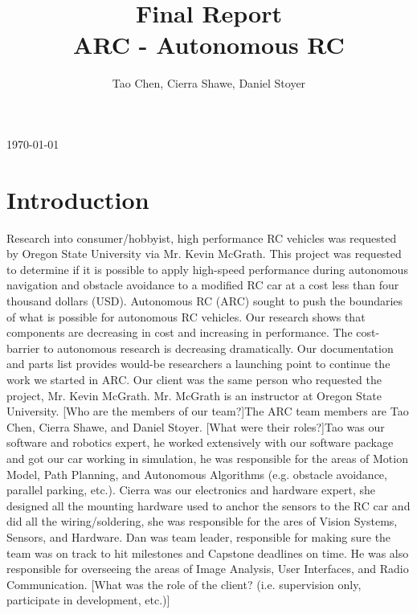 \documentclass[compsoc,draftclsnofoot,onecolumn,10pt]{IEEEtran}
\date{}
\begin{document}
\begin{titlepage}
	\title{Final Report\\
	ARC - Autonomous RC}
	\author{Tao Chen, Cierra Shawe, Daniel Stoyer}
	\maketitle
	\begin{center}
		\today
	\end{center}

	\thispagestyle{empty} %

\end{titlepage}

\tableofcontents

\newpage

\section{Introduction}
Research into consumer/hobbyist, high performance RC vehicles was requested by Oregon State University via Mr. Kevin McGrath. This project was requested to determine if it is possible to apply high-speed performance during autonomous navigation and obstacle avoidance to a modified RC car at a cost less than four thousand dollars (USD). Autonomous RC (ARC) sought to push the boundaries of what is possible for autonomous RC vehicles. Our research shows that components are decreasing in cost and increasing in performance. The cost-barrier to autonomous research is decreasing dramatically. Our documentation and parts list provides would-be researchers a launching point to continue the work we started in ARC. Our client was the same person who requested the project, Mr. Kevin McGrath. Mr. McGrath is an instructor at Oregon State University. [Who are the members of our team?]The ARC team members are Tao Chen, Cierra Shawe, and Daniel Stoyer. [What were their roles?]Tao was our software and robotics expert, he worked extensively with our software package and got our car working in simulation, he was responsible for the areas of Motion Model, Path Planning, and Autonomous Algorithms (e.g. obstacle avoidance, parallel parking, etc.). Cierra was our electronics and hardware expert, she designed all the mounting hardware used to anchor the sensors to the RC car and did all the wiring/soldering, she was responsible for the ares of Vision Systems, Sensors, and Hardware. Dan was team leader, responsible for making sure the team was on track to hit milestones and Capstone deadlines on time. He was also responsible for overseeing the areas of Image Analysis, User Interfaces, and Radio Communication. [What was the role of the client? (i.e. supervision only, participate in development, etc.)]
\newpage
\end{document}
